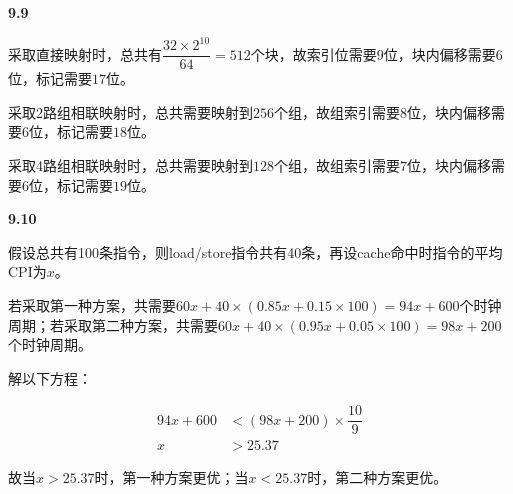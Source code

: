 \documentclass[UTF8]{report}
\begin{document}
\noindent
\textbf{9.9}

采取直接映射时，总共有$\dfrac{32 \times 2^{10}}{64} = 512$个块，故索引位需要$9$位，块内偏移需要$6$位，标记需要$17$位。

采取2路组相联映射时，总共需要映射到$256$个组，故组索引需要$8$位，块内偏移需要$6$位，标记需要$18$位。

采取4路组相联映射时，总共需要映射到$128$个组，故组索引需要$7$位，块内偏移需要$6$位，标记需要$19$位。

\noindent
\textbf{9.10}

假设总共有100条指令，则load/store指令共有40条，再设cache命中时指令的平均CPI为$x$。

若采取第一种方案，共需要$60x + 40 \times (0.85x + 0.15 \times 100) = 94x + 600$个时钟周期；若采取第二种方案，共需要$60x + 40 \times (0.95x + 0.05 \times 100) = 98x + 200$个时钟周期。

解以下方程：

\begin{align*}
    94x + 600 &< (98x + 200) \times \dfrac{10}{9} \\
    x &> 25.37
\end{align*}

故当$x > 25.37$时，第一种方案更优；当$x < 25.37$时，第二种方案更优。
\end{document}
